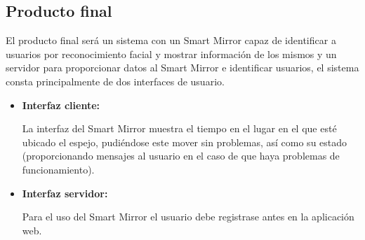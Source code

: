 \subsection{Producto final}

El producto final será un sistema con un Smart Mirror capaz de identificar a usuarios por reconocimiento facial y mostrar información de los mismos y un servidor para proporcionar datos al Smart Mirror e identificar usuarios, el sistema consta principalmente de dos interfaces de usuario.

\begin{itemize}
    \item \textbf{Interfaz cliente:}

	La interfaz del Smart Mirror muestra el tiempo en el lugar en el que esté ubicado el espejo, pudiéndose este mover sin problemas, así como su estado (proporcionando mensajes al usuario en el caso de que haya problemas de funcionamiento).

	\item \textbf{Interfaz servidor:}

	Para el uso del Smart Mirror el usuario debe registrase antes en la aplicación web.

\end{itemize}